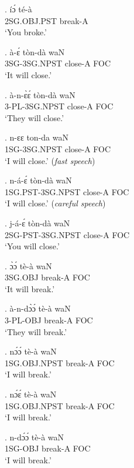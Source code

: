\documentclass{assets/fieldnotes}
\begin{document}
\exg.
íɔ́            té-à    \\
2SG.OBJ.PST   break-A \\%
`You broke.' \label{44430}

\exg.
à-ɛ́             tòn-dà    waN \\
3SG-3SG.NPST   close-A   FOC \\%
`It will close.'

\exg.
à-n-ɛ̀ɛ́           tòn-dà    waN \\
3-PL-3SG.NPST   close-A   FOC \\%
`They will close.'

\exg.
n-ɛɛ            ton-da    waN \\
1SG-3SG.NPST   close-A   FOC \\%
`I will close.' (\textit{fast speech})

\exg.
n-á-ɛ́            tòn-dà    waN \\
1SG.PST-3SG.NPST   close-A   FOC \\%
`I will close.' (\textit{careful speech})

\exg.
j-á-ɛ́            tòn-dà    waN \\
2SG-PST-3SG.NPST   close-A   FOC \\%
`You will close.'

\exg.
ɔ̀ɔ́             tè-à      waN \\
3SG.OBJ  break-A   FOC \\%
`It will break.'

\exg.
à-n-dɔ̀ɔ́          tè-à      waN \\
3-PL-OBJ   break-A   FOC \\%
`They will break.'

\exg.
nɔ́ɔ́            tè-à      waN \\
1SG.OBJ.NPST   break-A   FOC \\%
`I will break.'

\exg.
nɔ́ɛ́            tè-à      waN \\
1SG.OBJ.NPST   break-A   FOC \\%
`I will break.' \label{53108}


\exg.
n-dɔ́ɔ́           tè-à      waN \\
1SG-OBJ   break-A   FOC \\%
`I will break.' \label{39569}
\end{document}
